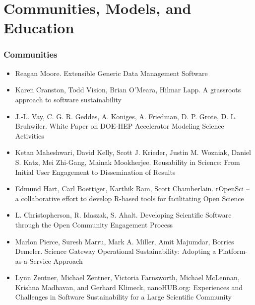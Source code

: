 \documentclass[11pt, oneside]{amsart}
\begin{document}
\section*{Communities, Models, and Education}

\subsubsection*{Communities}

\begin{itemize}

\item Reagan Moore. Extensible Generic Data Management Software~\cite{Moore_WSSSPE}

\item Karen Cranston, Todd Vision, Brian O'Meara, Hilmar Lapp. A
  grassroots approach to software sustainability~\cite{Cranston_WSSSPE}

\item J.-L. Vay, C. G. R. Geddes, A. Koniges, A. Friedman,
  D. P. Grote, D. L. Bruhwiler. White Paper on DOE-HEP Accelerator
  Modeling Science Activities~\cite{Vay_WSSSPE}

\item Ketan Maheshwari, David Kelly, Scott J. Krieder, Justin
  M. Wozniak, Daniel S. Katz, Mei Zhi-Gang, Mainak
  Mookherjee. Reusability in Science: From Initial User Engagement to
  Dissemination of Results~\cite{Maheshwari_WSSSPE}

\item Edmund Hart, Carl Boettiger, Karthik Ram, Scott
  Chamberlain. rOpenSci -- a collaborative effort to develop R-based
  tools for facilitating Open Science~\cite{Hart_WSSSPE}

\item L. Christopherson, R. Idaszak, S. Ahalt. Developing Scientific
  Software through the Open Community Engagement
  Process~\cite{Christopherson_WSSSPE}

\item Marlon Pierce, Suresh Marru, Mark A. Miller, Amit Majumdar,
  Borries Demeler. Science Gateway Operational Sustainability:
  Adopting a Platform-as-a-Service Approach~\cite{Pierce2_WSSSPE}

\item Lynn Zentner, Michael Zentner, Victoria Farnsworth, Michael
  McLennan, Krishna Madhavan, and Gerhard Klimeck, nanoHUB.org:
  Experiences and Challenges in Software Sustainability for a Large
  Scientific Community~\cite{Zentner_WSSSPE}


\end{itemize}
\end{document}
